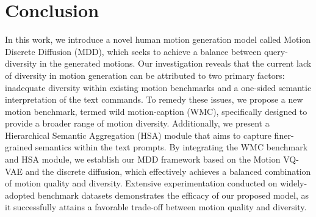 \documentclass[letterpaper]{article} \usepackage{aaai24}
\begin{document}
\section{Conclusion}
In this work, we introduce a novel human motion generation model called Motion Discrete Diffusion (MDD), which seeks to achieve a balance between query-diversity in the generated motions. Our investigation reveals that the current lack of diversity in motion generation can be attributed to two primary factors: inadequate diversity within existing motion benchmarks and a one-sided semantic interpretation of the text commands.
To remedy these issues, we propose a new motion benchmark, termed wild motion-caption (WMC), specifically designed to provide a broader range of motion diversity. Additionally, we present a Hierarchical Semantic Aggregation (HSA) module that aims to capture finer-grained semantics within the text prompts. By integrating the WMC benchmark and HSA module, we establish our MDD framework based on the Motion VQ-VAE and the discrete diffusion, which effectively achieves a balanced combination of motion quality and diversity.
Extensive experimentation conducted on widely-adopted benchmark datasets demonstrates the efficacy of our proposed model, as it successfully attains a favorable trade-off between motion quality and diversity.








































\clearpage
\appendix
{}
\end{document}

